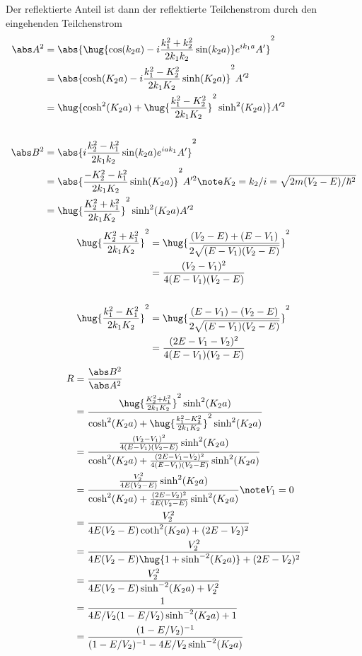 \documentclass[ex,minted]{exercise_4.0}
\begin{document}
Der reflektierte Anteil ist dann der reflektierte Teilchenstrom durch den eingehenden Teilchenstrom
\begin{align*}   
    \abs A^2 
    &= \abs{\hug{\cos(k_2 a)  - i \frac{k_1^2 + k_2^2}{2 k_1 k_2}  \sin(k_2 a)} e^{i k_{1} a} A'}^2\\
    &= \abs{{\cosh(K_2 a)  - i \frac{k_1^2 - K_2^2}{2 k_1 K_2} \sinh(K_2 a)}}^2 A'^2\\
    &= \hug{\cosh^2(K_2 a)  + \hug{\frac{k_1^2 - K_2^2}{2 k_1 K_2}}^2 \sinh^2(K_2 a)} A'^2\\
    \\
    \abs B^2 
    &= \abs{i\frac{k_2^2-k_1^2}{2 k_1 k_2} \sin(k_2 a) e^{i a k_1} A'}^2\\
    &= \abs{\frac{-K_2^2-k_1^2}{2 k_1 K_2} \sinh(K_2 a)}^2 A'^2\note K_2 = k_2 / i = \sqrt{2m(V_2 -  E)/\hbar^2}\\
    &= \hug{\frac{K_2^2+k_1^2}{2 k_1 K_2}}^2 \sinh^2(K_2 a) A'^2
\end{align*}
\begin{align*}
    \hug{\frac{K_2^2+k_1^2}{2 k_1 K_2}}^2 &= \hug{\frac{(V_2-E) + (E - V_1)}{2\sqrt{(E - V_1)(V_2 - E)}}}^2\\
    &= \frac{(V_2- V_1)^2}{4(E - V_1)(V_2 - E)}\\
    \\
    \hug{\frac{k_1^2-K_1^2}{2 k_1 K_2}}^2 &= \hug{\frac{(E - V_1) - (V_2-E)}{2\sqrt{(E - V_1)(V_2 - E)}}}^2\\
    &= \frac{(2E - V_1-V_2)^2}{4(E - V_1)(V_2 - E)}
\end{align*}
\begin{align*}
    R &= \frac{\abs B^2}{\abs A^2}\\ 
    &= \frac{\hug{\frac{K_2^2+k_1^2}{2 k_1 K_2}}^2 \sinh^2(K_2 a)}{\cosh^2(K_2 a)  + \hug{\frac{k_1^2 - K_2^2}{2 k_1 K_2}}^2 \sinh^2(K_2 a)}\\
    &= \frac{\frac{(V_2- V_1)^2}{4(E - V_1)(V_2 - E)} \sinh^2(K_2 a)}{\cosh^2(K_2 a)  + \frac{(2E - V_1-V_2)^2}{4(E - V_1)(V_2 - E)} \sinh^2(K_2 a)}\\
    &= \frac{\frac{V_2^2}{4E(V_2 - E)} \sinh^2(K_2 a)}{\cosh^2(K_2 a)  + \frac{(2E-V_2)^2}{4E(V_2 - E)} \sinh^2(K_2 a)}\note V_1=0\\
    &= \frac{V_2^2}{4E(V_2 - E)\coth^2(K_2 a)  + (2E-V_2)^2}\\
    &= \frac{V_2^2}{4E(V_2 - E)\hug{1 + \sinh^{-2}(K_2 a)}  + (2E-V_2)^2}\\
    &= \frac{V_2^2}{4E(V_2 - E)\sinh^{-2}(K_2 a)  + V_2^2}\\
    &= \frac{1}{4E/V_2(1 - E/V_2)\sinh^{-2}(K_2 a)  + 1}\\
    &= \frac{(1 - E/V_2)^{-1}}{(1 - E/V_2)^{-1} - 4E/V_2\sinh^{-2}(K_2 a) }
\end{align*}
\end{document}
